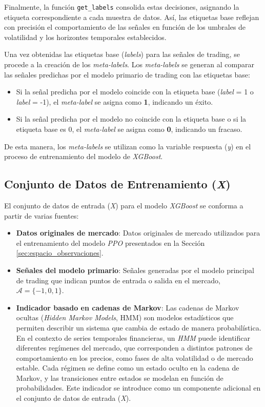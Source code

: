 \documentclass[a4paper,12pt, twoside]{report}
\begin{document}
Finalmente, la función \texttt{get\_labels} consolida estas decisiones, asignando 
la etiqueta correspondiente a cada muestra de datos. Así, las etiquetas base 
reflejan con precisión el comportamiento de las señales en función de los umbrales 
de volatilidad y los horizontes temporales establecidos.

Una vez obtenidas las etiquetas base (\textit{labels}) para las señales de trading, se procede a la creación de los \textit{meta-labels}. Los \textit{meta-labels} se generan al comparar las señales predichas por el modelo primario de trading con las etiquetas base:

\begin{itemize}
    \item Si la señal predicha por el modelo coincide con la etiqueta base (\textit{label} = 1 o \textit{label} = -1), el \textit{meta-label} se asigna como \textbf{1}, indicando un éxito.
    \item Si la señal predicha por el modelo no coincide con la etiqueta base o si la etiqueta base es 0, el \textit{meta-label} se asigna como \textbf{0}, indicando un fracaso.
\end{itemize}

De esta manera, los \textit{meta-labels} se utilizan como la variable respuesta (\textit{y}) en el proceso de entrenamiento del modelo de \textit{XGBoost}.

\subsection{Conjunto de Datos de Entrenamiento (\textit{X})}

El conjunto de datos de entrada (\textit{X}) para el modelo \textit{XGBoost} se conforma a 
partir de varias fuentes:

\begin{itemize}
    \item \textbf{Datos originales de mercado}: Datos originales de mercado utilizados para 
    el entrenamiento del modelo \textit{PPO} presentados en la Sección \ref{sec:espacio_observaciones}.
    \item \textbf{Señales del modelo primario}: Señales generadas por el modelo 
    principal de trading que indican puntos de entrada o salida en el mercado, $\mathcal{A} = \{-1, 0, 1\}$.
    \item \textbf{Indicador basado en cadenas de Markov}: Las cadenas de Markov ocultas 
    (\textit{Hidden Markov Models}, HMM) son modelos estadísticos que permiten describir 
    un sistema que cambia de estado de manera probabilística. En el contexto de series 
    temporales financieras, un \textit{HMM} puede identificar diferentes regímenes del 
    mercado, que corresponden a distintos patrones de comportamiento en los precios, 
    como fases de alta volatilidad o de mercado estable. Cada régimen se define como 
    un estado oculto en la cadena de Markov, y las transiciones entre estados se 
    modelan en función de probabilidades. Este indicador se introduce como un 
    componente adicional en el conjunto de datos de entrada (\textit{X}).
    
\end{itemize}
\end{document}
